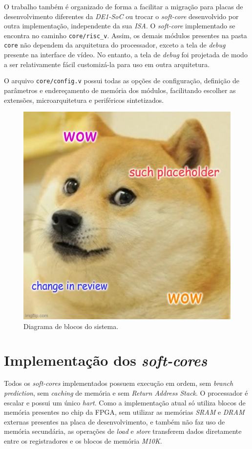 { O trabalho também é organizado de forma a facilitar a migração para placas de
    desenvolvimento diferentes da \textit{DE1-SoC} ou trocar o \textit{soft-core}
    desenvolvido por outra implementação, independente da sua \textit{ISA}.
    O \textit{soft-core} implementado se encontra no caminho
    \texttt{core/risc\_v}. Assim, os demais módulos presentes na pasta \texttt{core}
    não dependem da arquitetura do processador, exceto a tela de
    \textit{debug} presente na interface de vídeo. No entanto, a tela de
    \textit{debug} foi projetada de modo a ser relativamente fácil
    customizá-la para uso em outra arquitetura.
}

{
    O arquivo \texttt{core/config.v} possui todas as opções de configuração,
    definição de parâmetros e endereçamento de memória dos módulos, facilitando
    escolher as extensões, microarquitetura e periféricos sintetizados.
}


\begin{figure}[H]
\centering
    \includegraphics[width=0.6\linewidth]{../images/placeholder.jpg}
    \caption{Diagrama de blocos do sistema.}\label{fig:diagram_fpga_blocks}
\end{figure}


\section{Implementação dos \textit{soft-cores}}
    { Todos os \textit{soft-cores} implementados possuem execução em ordem, sem
        \textit{branch prediction}, sem \textit{caching} de memória e sem
        \textit{Return Address Stack}. O processador é escalar e possui um
        único \textit{hart}. Como a implementação atual só utiliza blocos de
        memória presentes no chip da FPGA, sem utilizar as memórias
        \textit{SRAM} e \textit{DRAM} externas presentes na placa de
        desenvolvimento, e também não faz uso de memória secundária, as operações
        de \textit{load} e \textit{store} transferem dados diretamente entre os
        registradores e os blocos de memória \textit{M10K}.
    }

